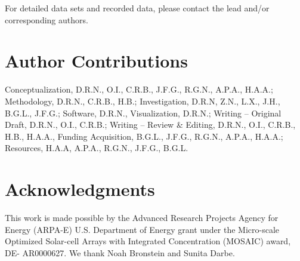 \documentclass[conference]{./pvsctran}
\begin{document}
	For detailed data sets and recorded data, please contact the lead and/or corresponding authors.
	
	\section*{Author Contributions}
	
	Conceptualization, D.R.N., O.I., C.R.B., J.F.G., R.G.N., A.P.A., H.A.A.; Methodology, D.R.N., C.R.B., H.B.; Investigation, D.R.N, Z.N., L.X., J.H., B.G.L., J.F.G.; Software, D.R.N., Visualization, D.R.N.; Writing – Original Draft, D.R.N., O.I., C.R.B.; Writing – Review \& Editing, D.R.N., O.I., C.R.B., H.B., H.A.A., Funding Acquisition, B.G.L., J.F.G., R.G.N., A.P.A., H.A.A.; Resources, H.A.A, A.P.A., R.G.N., J.F.G., B.G.L.
	
	\section*{Acknowledgments}	
	
	This work is made possible by the Advanced Research Projects Agency for Energy (ARPA-E) U.S. Department of Energy grant under the Micro-scale Optimized Solar-cell Arrays with Integrated Concentration (MOSAIC) award, DE- AR0000627.  We thank Noah Bronstein and Sunita Darbe.
	
	
	
	
	
\end{document}
